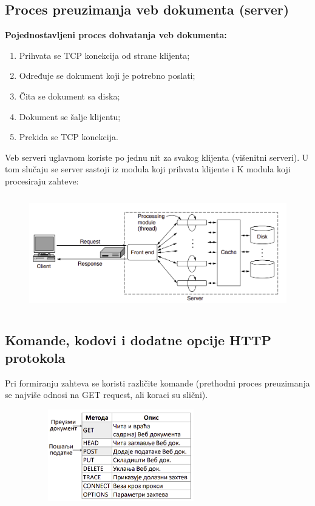 \documentclass[a4paper]{article}
\begin{document}
    \subsection{Proces preuzimanja veb dokumenta (server)}
        \noindent \textbf{Pojednostavljeni proces dohvatanja veb dokumenta:}
        \begin{enumerate}
            \item Prihvata se TCP konekcija od strane klijenta;
            \item Određuje se dokument koji je potrebno poslati;
            \item Čita se dokument sa diska;
            \item Dokument se šalje klijentu;
            \item Prekida se TCP konekcija.
        \end{enumerate}
        Veb serveri uglavnom koriste po jednu nit za svakog klijenta (višenitni serveri). U tom 
        slučaju se server sastoji iz modula koji prihvata klijente i K modula koji procesiraju
        zahteve:
        \begin{figure}[H]
            \begin{center}
                \includegraphics[width=120mm,height=50mm]{Slike/http3.png}
            \end{center}
        \end{figure}

    \subsection{Komande, kodovi i dodatne opcije HTTP protokola}
        Pri formiranju zahteva se koristi različite komande (prethodni proces preuzimanja se 
        najviše odnosi na GET request, ali koraci su slični). 
        \begin{figure}[H]
            \begin{center}
                \includegraphics[width=80mm,height=40mm]{Slike/http4.png}
            \end{center}
        \end{figure}
\end{document}
